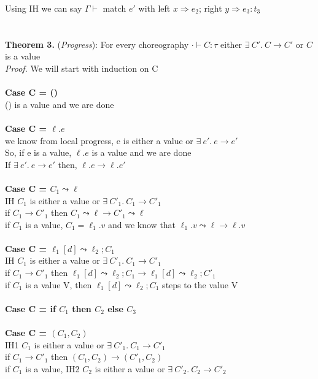 \documentclass{article}
\begin{document}
Using IH we can say $\Gamma \vdash$ match $e'$ with left $x \Rightarrow e_2 $; right $ y \Rightarrow e_3 : t_3$ 
\\\\
\\
\textbf{Theorem 3.} (\textit{Progress}): For every choreography $\cdot \vdash C : \tau$ either $  \exists \ C'.\ C \to C'$  or $C$ is a value
  \\
\textit{Proof.} We will start with induction on C \\\\
\textbf{Case C = ()} \\
() is a value and we are done \\ \\
\textbf{Case C = $\ell.e$} \\
we know from local progress, e is either a value or $ \exists \ e'.\ e \to e'$  \\
So, if e is a value, $\ell.e$ is a value and we are done \\
If $ \exists \ e'.\ e \to e'$ then, $ \ell. e \to \ell.e'$
\\ \\
\textbf{Case C = $C_1 \leadsto \ell$} \\
IH $C_1$ is either a value or $  \exists \ C'_1.\ C_1 \to C'_1 $ \\
if $C_1 \to C'_1$ then $C_1 \leadsto \ell \to C'_1 \leadsto \ell$ \\
if $C_1$ is a value, $C_1 = \ell_1.v$ and we know that $\ell_1.v \leadsto \ell \to \ell.v$ 
\\
\\
\textbf{Case C = $\ell_1[d] \leadsto \ell_2; C_1$} \\
IH $C_1$ is either a value or $  \exists \ C'_1.\ C_1 \to C'_1 $ \\
if $C_1 \to C'_1$ then $\ell_1[d] \leadsto \ell_2; C_1 \to \ell_1[d] \leadsto \ell_2; C'_1$ \\
if $C_1$ is a value V, then $\ell_1[d] \leadsto \ell_2; C_1$ steps to the value V
\\
\\
\textbf{Case C = if $C_1$ then $C_2$ else $C_3$} \\
\\
\textbf{Case C = $(C_1,C_2)$} \\
IH1 $C_1$ is either a value or $  \exists \ C'_1.\ C_1 \to C'_1 $ \\
if $C_1 \to C'_1$ then $(C_1,C_2) \to (C'_1, C_2)$\\
if $C_1$ is a value, IH2 $C_2$ is either a value or $  \exists \ C'_2.\ C_2 \to C'_2 $ \\
\end{document}
